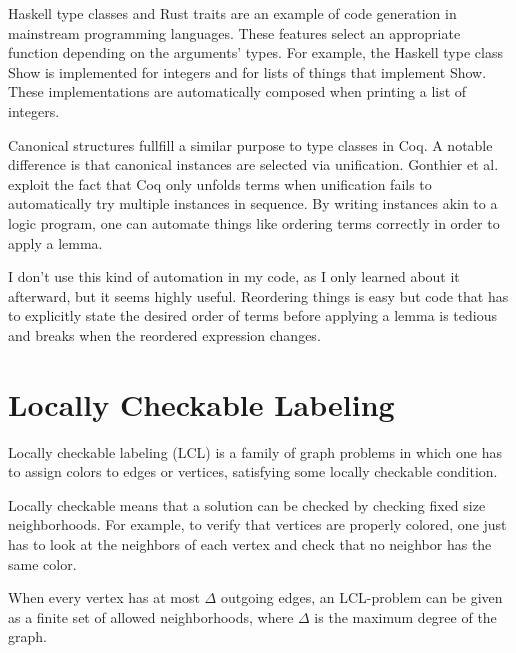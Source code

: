 \documentclass[english, 12pt, a4paper, sci, a-1b, online]{aaltothesis}
\begin{document}
Haskell type classes and Rust traits are an example of code generation in mainstream programming languages. These features select an appropriate function depending on the arguments' types. For example, the Haskell type class Show is implemented for integers and for lists of things that implement Show. These implementations are automatically composed when printing a list of integers.

Canonical structures fullfill a similar purpose to type classes in Coq. A notable difference is that canonical instances are selected via unification. Gonthier et al.~\cite{overloadingCanonical} exploit the fact that Coq only unfolds terms when unification fails to automatically try multiple instances in sequence. By writing instances akin to a logic program, one can automate things like ordering terms correctly in order to apply a lemma.

I don't use this kind of automation in my code, as I only learned about it afterward, but it seems highly useful. Reordering things is easy but code that has to explicitly state the desired order of terms before applying a lemma is tedious and breaks when the reordered expression changes.

\clearpage %

\section{Locally Checkable Labeling}

Locally checkable labeling (LCL) is a family of graph problems in which one has to assign colors to edges or vertices, satisfying some locally checkable condition.~\cite{LCL}

Locally checkable means that a solution can be checked by checking fixed size neighborhoods. For example, to verify that vertices are properly colored, one just has to look at the neighbors of each vertex and check that no neighbor has the same color.

When every vertex has at most $\Delta$ outgoing edges, an LCL-problem can be given as a finite set of allowed neighborhoods, where $\Delta$ is the maximum degree of the graph.

\newcommand\tick{\fill[scale=0.6, color=black!40!green](0,.35) -- (.25,0) -- (1,.7) -- (.25,.15) -- cycle;}
\newcommand\cross{\draw[scale=0.3, very thick, color=red] (0,0) -- (1, 1) {} (0, 1) -- (1, 0) {};}
\end{document}
